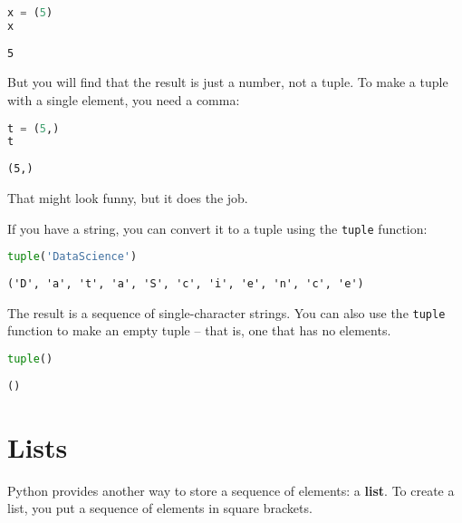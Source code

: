 \begin{lstlisting}[language=Python,style=source]
x = (5)
x
\end{lstlisting}

\begin{lstlisting}[style=output]
5
\end{lstlisting}

But you will find that the result is just a number, not a tuple. To make
a tuple with a single element, you need a comma:

\begin{lstlisting}[language=Python,style=source]
t = (5,)
t
\end{lstlisting}

\begin{lstlisting}[style=output]
(5,)
\end{lstlisting}

That might look funny, but it does the job.

If you have a string, you can convert it to a tuple using the
\passthrough{\lstinline!tuple!} function:

\begin{lstlisting}[language=Python,style=source]
tuple('DataScience')
\end{lstlisting}

\begin{lstlisting}[style=output]
('D', 'a', 't', 'a', 'S', 'c', 'i', 'e', 'n', 'c', 'e')
\end{lstlisting}

The result is a sequence of single-character strings. You can also use
the \passthrough{\lstinline!tuple!} function to make an empty tuple --
that is, one that has no elements.

\begin{lstlisting}[language=Python,style=source]
tuple()
\end{lstlisting}

\begin{lstlisting}[style=output]
()
\end{lstlisting}

\section{Lists}\label{lists}

Python provides another way to store a sequence of elements: a
\textbf{list}. To create a list, you put a sequence of elements in
square brackets.

